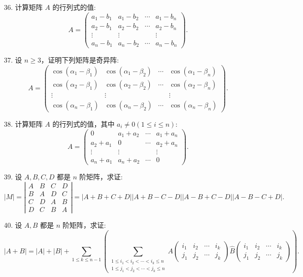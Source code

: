 \documentclass[UTF8,12pt,a4paper,fontset=fandol]{ctexart}
\begin{document}
36. 计算矩阵 $A$ 的行列式的值:
\[
A=\left(\begin{array}{cccc}
a_1-b_1 & a_1-b_2 & \cdots & a_1-b_n\\
a_2-b_1 & a_2-b_2 & \cdots & a_2-b_n\\
\vdots & \vdots & & \vdots\\
a_n-b_1 & a_n-b_2 & \cdots & a_n-b_n
\end{array}\right).
\]

37. 设 $n\geq 3$，证明下列矩阵是奇异阵:
\[
A=\left(\begin{array}{cccc}
\cos(\alpha_1-\beta_1) & \cos(\alpha_1-\beta_2) & \cdots & \cos(\alpha_1-\beta_n)\\
\cos(\alpha_2-\beta_1) & \cos(\alpha_2-\beta_2) & \cdots & \cos(\alpha_2-\beta_n)\\
\vdots & \vdots & & \vdots\\
\cos(\alpha_n-\beta_1) & \cos(\alpha_n-\beta_2) & \cdots & \cos(\alpha_n-\beta_n)
\end{array}\right).
\]

38. 计算矩阵 $A$ 的行列式的值，其中 $a_i\neq 0(1\leq i\leq n)$:
\[
A=\left(\begin{array}{cccc}
0 & a_1+a_2 & \cdots & a_1+a_n\\
a_2+a_1 & 0 & \cdots & a_2+a_n\\
\vdots & \vdots & & \vdots\\
a_n+a_1 & a_n+a_2 & \cdots & 0
\end{array}\right).
\]

39. 设 $A,B,C,D$ 都是 $n$ 阶矩阵，求证:
\[
|M|=\left|\begin{array}{cccc}
A & B & C & D\\
B & A & D & C\\
C & D & A & B\\
D & C & B & A
\end{array}\right|
=|A+B+C+D||A+B-C-D||A-B+C-D||A-B-C+D|.
\]

40. 设 $A,B$ 都是 $n$ 阶矩阵，求证:
\[
|A+B|=|A|+|B|+
\sum_{1\leq k\leq n-1}
\left(
\sum_{\substack{1\leq i_1<i_2<\cdots<i_k\leq n\\
1\leq j_1<j_2<\cdots<j_k\leq n}}
A\left(\begin{array}{cccc}
i_1 & i_2 & \cdots & i_k\\
j_1 & j_2 & \cdots & j_k
\end{array}\right)
\widehat{B}\left(\begin{array}{cccc}
i_1 & i_2 & \cdots & i_k\\
j_1 & j_2 & \cdots & j_k
\end{array}\right)
\right).
\]
\end{document}
